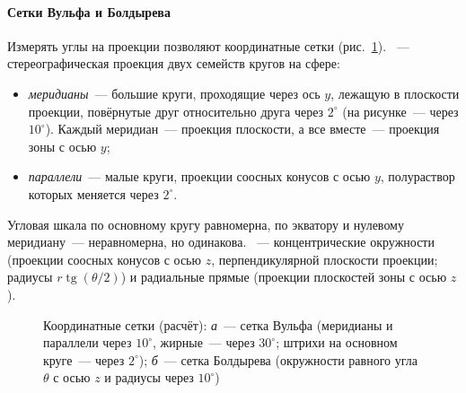 \paragraph{Сетки Вульфа и Болдырева}
Измерять углы на проекции позволяют координатные сетки
(рис.~\ref{fig:nets}). ~— стереографическая проекция
двух семейств кругов на сфере:
\begin{itemize}
\item \emph{меридианы}~— большие круги, проходящие через ось $y$, лежащую в
плоскости проекции, повёрнутые друг относительно друга через $2^\circ$
(на рисунке~— через $10^\circ$). Каждый меридиан~— проекция плоскости, а
все вместе~— проекция зоны с осью $y$;
\item \emph{параллели}~— малые круги, проекции соосных конусов с осью $y$,
полураствор которых меняется через $2^\circ$.
\end{itemize}
Угловая шкала по основному кругу равномерна, по экватору и нулевому
меридиану~— неравномерна, но одинакова. ~—
концентрические окружности (проекции соосных конусов с осью $z$,
перпендикулярной плоскости проекции; радиусы $r\operatorname{tg}(\theta/2)$) и
радиальные прямые (проекции плоскостей зоны с осью $z$).

\begin{figure}[ht]
\centering
{}
\begin{subfigure}[b]{0.48\textwidth}\centering
{}
\caption{}
\end{subfigure}\hfill
\begin{subfigure}[b]{0.48\textwidth}\centering
\begin{tikzpicture}[scale=2.9]
  
\end{tikzpicture}
\caption{}
\end{subfigure}
\caption{Координатные сетки (расчёт): \textit{а}~— сетка Вульфа (меридианы
и параллели через $10^\circ$, жирные~— через $30^\circ$; штрихи на основном
круге~— через $2^\circ$); \textit{б}~— сетка Болдырева (окружности равного
угла $\theta$ с осью $z$ и радиусы через $10^\circ$)}
\label{fig:nets}
\end{figure}

